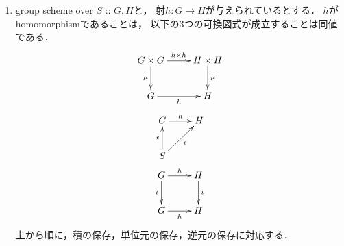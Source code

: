 \documentclass[a4paper]{jsarticle}
\begin{document}
\begin{Prop}
\begin{enumerate}[label=(\roman*),leftmargin=*]
        \item
        group scheme over $S$ :: $G,H$と，
        射$h: G \to H$が与えられているとする．
        $h$がhomomorphismであることは，
        以下の3つの可換図式が成立することは同値である．
        \begin{gather}
            \xymatrix
            {
                \ar[d]_-{\mu} G \times G \ar[r]^-{h \times h}& H \times H \ar[d]^-{\mu}\\
                G \ar[r]_-{h}& H
            } \\
            \xymatrix
            {
                G \ar[r]^-{h}& H \\
                S \ar[u]^-{\epsilon} \ar[ru]_-{\epsilon}& {}
            } \\
            \xymatrix
            {
                \ar[d]_-{\iota} G \ar[r]^-{h}& H \ar[d]^-{\iota}\\
                G \ar[r]_-{h}& H
            }
        \end{gather}
        上から順に，積の保存，単位元の保存，逆元の保存に対応する．
    \end{enumerate}
    \end{Prop}
\end{document}

